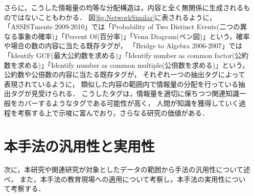 さらに，こうした情報量の均等な分配構造は，内容と全く無関係に生成されるものではないこともわかる．
図\ref{fig:NetworkSimilar}に表されるように，
「ASSISTments 2009-2010」では「Probability of Two Distinct Events(二つの異なる事象の確率)」「Percent Of(百分率)」「Venn Diagram(ベン図)」という，確率や場合の数の内容に当たる既存タグが，
「Bridge to Algebra 2006-2007」では「Identify GCF(最大公約数を求める)」「Identify number as common factor(公約数を求める)」「Identify number as common multiple(公倍数を求める)」という，公約数や公倍数の内容に当たる既存タグが，
それぞれ一つの抽出タグによって表現されているように，
類似した内容の範囲内で情報量の分配を行っている抽出タグが見受けられる．
こうしたタグは，情報量を適切に保ちつつ関連知識一般をカバーするようなタグである可能性が高く，
人間が知識を獲得していく過程を考察する上で示唆に富んでおり，さらなる研究の価値がある．



\section{本手法の汎用性と実用性}
次に，本研究や関連研究が対象としたデータの範囲から手法の汎用性について述べ，
また，本手法の教育現場への適用について考察し，本手法の実用性について考察する．
%
%
%


